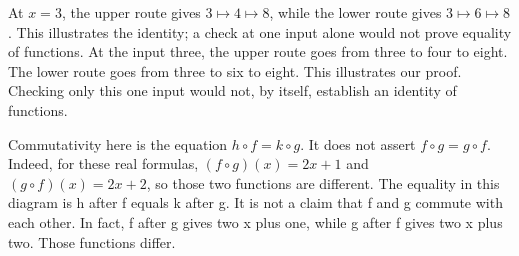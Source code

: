 \documentclass{article}
\begin{document}
{At $x=3$, the upper route gives $3\mapsto4\mapsto8$, while the lower route gives $3\mapsto6\mapsto8$. This illustrates the identity; a check at one input alone would not prove equality of functions.}
{At the input three, the upper route goes from three to four to eight. The lower route goes from three to six to eight. This illustrates our proof. Checking only this one input would not, by itself, establish an identity of functions.}

{Commutativity here is the equation $h\circ f=k\circ g$. It does not assert $f\circ g=g\circ f$. Indeed, for these real formulas, $(f\circ g)(x)=2x+1$ and $(g\circ f)(x)=2x+2$, so those two functions are different.}
{The equality in this diagram is h after f equals k after g. It is not a claim that f and g commute with each other. In fact, f after g gives two x plus one, while g after f gives two x plus two. Those functions differ.}
\end{document}
